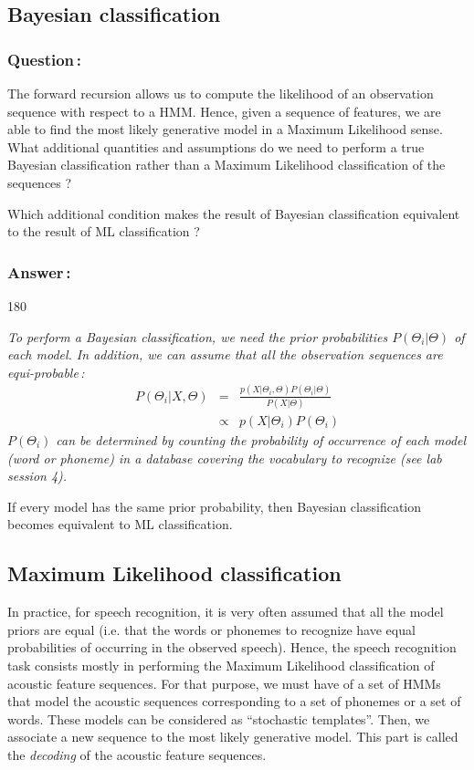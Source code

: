 \documentclass[twoside,a4paper,titlepage]{article}
\newcommand{\expl}[1]{%
\begin{turn}{180}%
\parbox{\textwidth}{\em #1}%
\end{turn}%
}
\newcommand{\tab}{\hspace{1em}}
\begin{document}
\vspace{-1em}
\subsection{Bayesian classification}
\label{sub:bayesian}
\subsubsection*{Question\,:}
\vspace{-0.5em}
The forward recursion allows us to compute the likelihood of an observation
sequence with respect to a HMM. Hence, given a sequence of features, we are
able to find the most likely generative model in a Maximum Likelihood
sense. What additional quantities and assumptions do we need to perform a
true Bayesian classification rather than a Maximum Likelihood
classification of the sequences ?

Which additional condition makes the result of Bayesian classification
equivalent to the result of ML classification ?
\vspace{-0.5em}
\subsubsection*{Answer\,:}
\vspace{-0.5em}
\expl{
%
To perform a Bayesian classification, we need the prior probabilities
$P(\Theta_i|\Theta)$ of each model. In addition, we can assume that all the
observation sequences are equi-probable\,:
\begin{eqnarray}
P(\Theta_i|X,\Theta) & = & \frac{p(X|\Theta_i,\Theta)
					P(\Theta_i|\Theta)}{P(X|\Theta)} \nonumber \\
 & \propto & p(X|\Theta_i) P(\Theta_i) \nonumber
\end{eqnarray}
$P(\Theta_i)$ can be determined by counting the probability of occurrence
of each model (word or phoneme) in a database covering the vocabulary to
recognize (see lab session 4).

\tab If every model has the same prior probability, then Bayesian
classification becomes equivalent to ML classification.  }

\pagebreak
\subsection{Maximum Likelihood classification}
\label{sub:class}
In practice, for speech recognition, it is very often assumed that all the
model priors are equal (i.e. that the words or phonemes to recognize have
equal probabilities of occurring in the observed speech). Hence, the speech
recognition task consists mostly in performing the Maximum Likelihood
classification of acoustic feature sequences. For that purpose, we must
have of a set of HMMs that model the acoustic sequences corresponding to a
set of phonemes or a set of words. These models can be considered as
``stochastic templates''. Then, we associate a new sequence to the most
likely generative model. This part is called the {\em decoding} of the
acoustic feature sequences.
\end{document}
